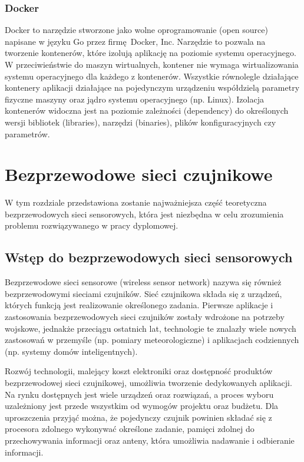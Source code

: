 \documentclass[a4paper,12pt,twoside,openany]{report}
\begin{document}
\subsection{Docker}

Docker to narzędzie stworzone jako wolne oprogramowanie (open source) napisane w języku Go przez firmę Docker, Inc.
Narzędzie to pozwala na tworzenie kontenerów, które izolują aplikację na poziomie systemu operacyjnego. W przeciwieństwie do maszyn wirtualnych, kontener nie wymaga
wirtualizowania systemu operacyjnego dla każdego z kontenerów. Wszystkie równolegle działające kontenery aplikacji działające na pojedynczym urządzeniu współdzielą
parametry fizyczne maszyny oraz jądro systemu operacyjnego (np. Linux). Izolacja kontenerów widoczna jest na poziomie zależności (dependency) do określonych wersji
bibliotek (libraries), narzędzi (binaries), plików konfiguracyjnych czy parametrów.

\chapter{Bezprzewodowe sieci czujnikowe}

W tym rozdziale przedstawiona zostanie najważniejsza część teoretyczna bezprzewodowych sieci sensorowych, która jest niezbędna w celu zrozumienia problemu
rozwiązywanego w pracy dyplomowej.

\section{Wstęp do bezprzewodowych sieci sensorowych}
Bezprzewodowe sieci sensorowe (wireless sensor network) nazywa się również bezprzewodowymi sieciami czujników.
Sieć czujnikowa składa się z urządzeń, których funkcją jest realizowanie określonego zadania.
Pierwsze aplikacje i zastosowania bezprzewodowych sieci czujników zostały wdrożone na potrzeby wojskowe, jednakże przeciągu ostatnich lat, technologie te znalazły
wiele nowych zastosowań w przemyśle (np. pomiary meteorologiczne) i aplikacjach codziennych (np. systemy domów inteligentnych).

Rozwój technologii, malejący koszt elektroniki oraz dostępność produktów bezprzewodowej sieci czujnikowej, umożliwia tworzenie dedykowanych aplikacji.
Na rynku dostępnych jest wiele urządzeń oraz rozwiązań, a proces wyboru uzależniony jest przede wszystkim od wymogów projektu oraz budżetu.
Dla uproszczenia przyjąć można, że pojedynczy czujnik powinien składać się z procesora zdolnego wykonywać określone zadanie, pamięci zdolnej do przechowywania informacji
oraz anteny, która umożliwia nadawanie i odbieranie informacji.
\end{document}
